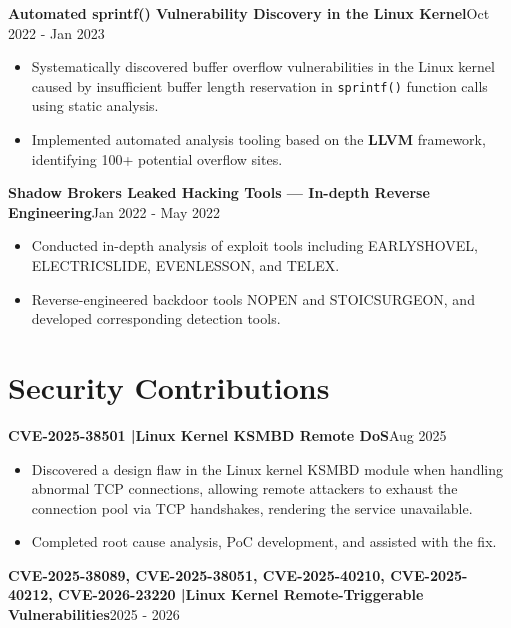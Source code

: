 \documentclass[11pt, a4paper]{article}
\newcommand{\resumeentry}[2]{%
  \noindent\textbf{#1}\hfill{#2}\par
}
\begin{document}
\vspace{6pt}

\resumeentry{Automated sprintf() Vulnerability Discovery in the Linux Kernel}{Oct 2022 - Jan 2023}

\begin{itemize}
  \item Systematically discovered buffer overflow vulnerabilities in the Linux kernel caused by insufficient buffer length reservation in \texttt{sprintf()} function calls using static analysis.
  \item Implemented automated analysis tooling based on the \textbf{LLVM} framework, identifying 100+ potential overflow sites.
\end{itemize}

\vspace{6pt}

\resumeentry{Shadow Brokers Leaked Hacking Tools --- In-depth Reverse Engineering}{Jan 2022 - May 2022}

\begin{itemize}
  \item Conducted in-depth analysis of exploit tools including EARLYSHOVEL, ELECTRICSLIDE, EVENLESSON, and TELEX.
  \item Reverse-engineered backdoor tools NOPEN and STOICSURGEON, and developed corresponding detection tools.
\end{itemize}

\section{Security Contributions}

\resumeentry{CVE-2025-38501 \enspace|\enspace Linux Kernel KSMBD Remote DoS}{Aug 2025}

\begin{itemize}
  \item Discovered a design flaw in the Linux kernel KSMBD module when handling abnormal TCP connections, allowing remote attackers to exhaust the connection pool via TCP handshakes, rendering the service unavailable.
  \item Completed root cause analysis, PoC development, and assisted with the fix.
\end{itemize}

\vspace{6pt}

\resumeentry{CVE-2025-38089, CVE-2025-38051, CVE-2025-40210, CVE-2025-40212, CVE-2026-23220 \enspace|\enspace Linux Kernel Remote-Triggerable Vulnerabilities}{2025 - 2026}
\end{document}
